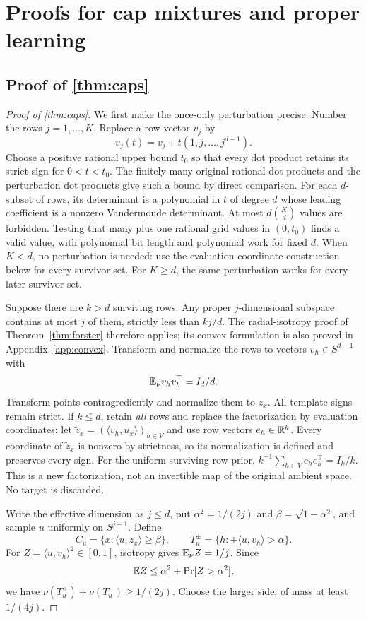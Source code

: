 \section{Proofs for cap mixtures and proper learning}\label{app:proofs-B}

\subsection[Proof of result caps]{Proof of \cref{thm:caps}}\label{proof:caps}
\begin{proof}[Proof of \cref{thm:caps}]
We first make the once-only perturbation precise. Number the rows $j=1,\ldots,K$. Replace a row vector $v_j$ by
\[
 v_j(t)=v_j+t(1,j,\ldots,j^{d-1}).
\]
Choose a positive rational upper bound $t_0$ so that every dot product retains its strict sign for $0<t<t_0$. The finitely many original rational dot products and the perturbation dot products give such a bound by direct comparison. For each $d$-subset of rows, its determinant is a polynomial in $t$ of degree $d$ whose leading coefficient is a nonzero Vandermonde determinant. At most $d\binom Kd$ values are forbidden. Testing that many plus one rational grid values in $(0,t_0)$ finds a valid value, with polynomial bit length and polynomial work for fixed $d$. When $K<d$, no perturbation is needed: use the evaluation-coordinate construction below for every survivor set. For $K\ge d$, the same perturbation works for every later survivor set.

Suppose there are $k>d$ surviving rows. Any proper $j$-dimensional subspace contains at most $j$ of them, strictly less than $kj/d$. The radial-isotropy proof of Theorem~\ref{thm:forster} therefore applies; its convex formulation is also proved in Appendix~\ref{app:convex}. Transform and normalize the rows to vectors $v_h\in S^{d-1}$ with
\[
 \mathbb E_\nu v_hv_h^\top=I_d/d.
\]
Transform points contragrediently and normalize them to $z_x$. All template signs remain strict. If $k\le d$, retain \emph{all} rows and replace the factorization by evaluation coordinates: let $\widetilde z_x=(\langle v_h,u_x\rangle)_{h\in V}$ and use row vectors $e_h\in\mathbb R^k$. Every coordinate of $\widetilde z_x$ is nonzero by strictness, so its normalization is defined and preserves every sign. For the uniform surviving-row prior, $k^{-1}\sum_{h\in V}e_he_h^\top=I_k/k$. This is a new factorization, not an invertible map of the original ambient space. No target is discarded.

Write the effective dimension as $j\le d$, put $\alpha^2=1/(2j)$ and $\beta=\sqrt{1-\alpha^2}$, and sample $u$ uniformly on $S^{j-1}$. Define
\[
 C_u=\{x:\langle u,z_x\rangle\ge\beta\},\qquad
 T_u^\pm=\{h:\pm\langle u,v_h\rangle>\alpha\}.
\]
For $Z=\langle u,v_h\rangle^2\in[0,1]$, isotropy gives $\mathbb E_\nu Z=1/j$. Since
\[
 \mathbb E Z\le\alpha^2+\Pr[Z>\alpha^2],
\]
we have $\nu(T_u^+)+\nu(T_u^-)\ge1/(2j)$. Choose the larger side, of mass at least $1/(4j)$.


\end{proof}
